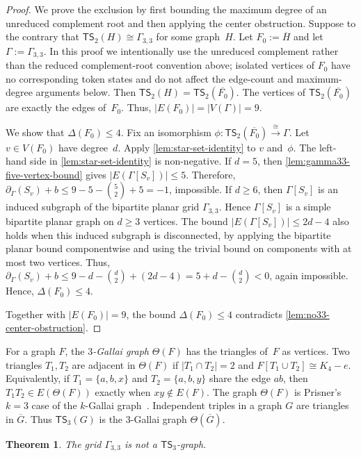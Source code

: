 \documentclass[a4paper]{article}
\theoremstyle{plain}
\newtheorem{theorem}{Theorem}[section]
\theoremstyle{definition}
\newcommand{\TSsym}{\mathsf{TS}}
\numberwithin{equation}{section}
\begin{document}
\begin{proof}
We prove the exclusion by first bounding the maximum degree of an unreduced complement root and then applying the center obstruction.
Suppose to the contrary that $\TSsym_2(H)\cong\Gamma_{3,3}$ for some graph~$H$.
Let $F_0:=\overline{H}$ and let $\Gamma:=\Gamma_{3,3}$.
In this proof we intentionally use the unreduced complement rather than the reduced complement-root convention above; isolated vertices of $F_0$ have no corresponding token states and do not affect the edge-count and maximum-degree arguments below.
Then $\TSsym_2(H)=\TSsym_2(\overline{F_0})$.
The vertices of $\TSsym_2(\overline{F_0})$ are exactly the edges of~$F_0$.
Thus, $|E(F_0)|=|V(\Gamma)|=9$.

We show that $\Delta(F_0)\le 4$.
Fix an isomorphism $\phi:\TSsym_2(\overline{F_0})\xrightarrow{\cong}\Gamma$.
Let $v\in V(F_0)$ have degree~$d$.
Apply \cref{lem:star-set-identity} to $v$ and~$\phi$.
The left-hand side in \cref{lem:star-set-identity} is non-negative.
If $d=5$, then \cref{lem:gamma33-five-vertex-bound} gives $|E(\Gamma[S_v])|\le 5$.
Therefore, $\displaystyle \partial_\Gamma(S_v)+b\le 9-5-\binom52+5=-1$,
impossible.
If $d\ge 6$, then $\Gamma[S_v]$ is an induced subgraph of the bipartite planar grid $\Gamma_{3,3}$.
Hence $\Gamma[S_v]$ is a simple bipartite planar graph on $d\ge 3$ vertices.
The bound $|E(\Gamma[S_v])|\le 2d-4$ also holds when this induced subgraph is disconnected, by applying the bipartite planar bound componentwise and using the trivial bound on components with at most two vertices.
Thus, $\displaystyle \partial_\Gamma(S_v)+b\le 9-d-\binom d2+(2d-4)=5+d-\binom d2<0$,
again impossible.
Hence, $\Delta(F_0)\le 4$.

Together with $|E(F_0)|=9$, the bound $\Delta(F_0)\le 4$ contradicts \cref{lem:no33-center-obstruction}.
\end{proof}

For a graph $F$, the \emph{$3$-Gallai graph} $\Theta(F)$ has the triangles of~$F$ as vertices.
Two triangles $T_1,T_2$ are adjacent in $\Theta(F)$ if $|T_1\cap T_2|=2$ and $F[T_1\cup T_2]\cong K_4-e$.
Equivalently, if $T_1=\{a,b,x\}$ and $T_2=\{a,b,y\}$ share the edge $ab$, then $T_1T_2\in E(\Theta(F))$ exactly when $xy\notin E(F)$.
The graph $\Theta(F)$ is Prisner's $k=3$ case of the $k$-Gallai graph~\cite[Def.~15.1, Sec.~15.1]{Prisner1995GraphDynamics}.
Independent triples in a graph $G$ are triangles in $\overline G$.
Thus $\TSsym_3(G)$ is the $3$-Gallai graph $\Theta(\overline G)$.

\begin{theorem}
\label{thm:no33-ts3}
The grid $\Gamma_{3,3}$ is not a $\TSsym_3$-graph.
\end{theorem}
\end{document}

